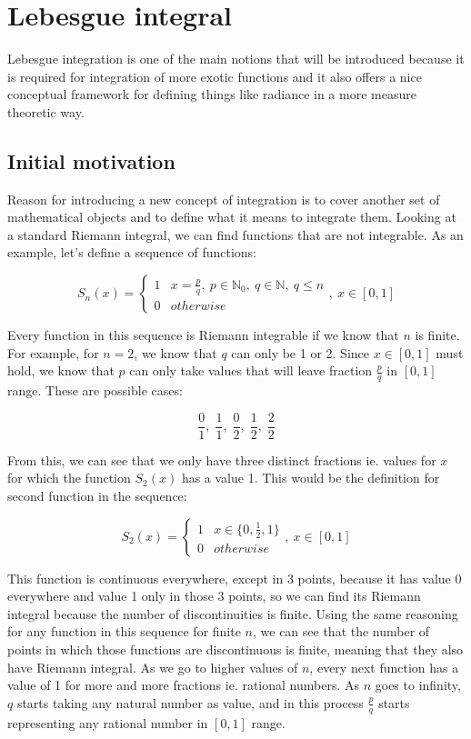 \documentclass{article}
\begin{document}
\section{Lebesgue integral}
Lebesgue integration is one of the main notions that will be introduced because it is required for integration of more exotic functions and it also offers a nice conceptual framework for defining things like radiance in a more measure theoretic way.

\subsection{Initial motivation}
Reason for introducing a new concept of integration is to cover another set of mathematical objects and to define what it means to integrate them. Looking at a standard Riemann integral, we can find functions that are not integrable. As an example, let's define a sequence of functions:

\[ S_n(x) = \begin{cases}
    1 & x = \frac{p}{q},\: p \in \mathbb{N}_0,\: q \in \mathbb{N},\: q \leq n \\
    0 & otherwise
\end{cases},\: x \in [0, 1] \]

Every function in this sequence is Riemann integrable if we know that $n$ is finite. For example, for $n=2$, we know that $q$ can only be 1 or 2. Since $x \in [0, 1]$ must hold, we know that $p$ can only take values that will leave fraction $\frac{p}{q}$ in $[0, 1]$ range. These are possible cases:

\[\frac{0}{1},\;\frac{1}{1},\;\frac{0}{2},\;\frac{1}{2},\;\frac{2}{2}\]

From this, we can see that we only have three distinct fractions ie. values for $x$ for which the function $S_2(x)$ has a value 1. This would be the definition for second function in the sequence:

\[S_2(x) = \begin{cases}
    1 & x \in \{0,\frac{1}{2},1\} \\
    0 & otherwise
\end{cases},\: x \in [0, 1] \]

This function is continuous everywhere, except in 3 points, because it has value 0 everywhere and value 1 only in those 3 points, so we can find its Riemann integral because the number of discontinuities is finite. Using the same reasoning for any function in this sequence for finite $n$, we can see that the number of points in which those functions are discontinuous is finite, meaning that they also have Riemann integral. As we go to higher values of $n$, every next function has a value of 1 for more and more fractions ie. rational numbers. As $n$ goes to infinity, $q$ starts taking any natural number as value, and in this process $\frac{p}{q}$ starts representing any rational number in $[0, 1]$ range.
\end{document}
